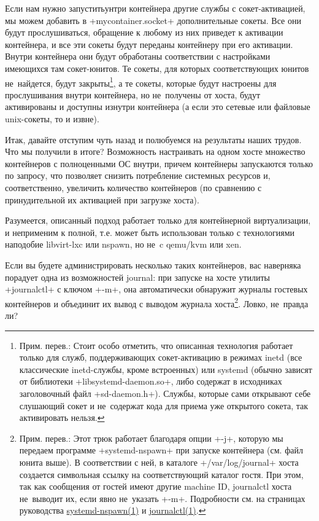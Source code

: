 \documentclass[10pt,oneside,a4paper]{article}
\begin{document}
Если нам нужно запуститьунтри контейнера другие службы с сокет-активацией, мы
можем добавить в +mycontainer.socket+ дополнительные сокеты. Все они будут
прослушиваться, обращение к любому из них приведет к активации контейнера, и все
эти сокеты будут переданы контейнеру при его активации. Внутри контейнера они
будут обработаны соответствии с настройками имеющихся там сокет-юнитов. Те
сокеты, для которых соответствующих юнитов не~найдется, будут
закрыты\footnote{Прим. перев.: Стоит особо отметить, что описанная технология
работает только для служб, поддерживающих сокет-активацию в режимах inetd (все
классические inetd-службы, кроме встроенных) или systemd (обычно зависят от
библиотеки +libsystemd-daemon.so+, либо содержат в исходниках заголовочный файл
+sd-daemon.h+). Службы, которые сами открывают себе слушающий сокет и
не~содержат кода для приема уже открытого сокета, так активировать нельзя.}, а
те сокеты, которые будут настроены для прослушивания внутри контейнера, но
не~получены от хоста, будут активированы и доступны изнутри контейнера (а если
это сетевые или файловые unix-сокеты, то и извне).

Итак, давайте отступим чуть назад и полюбуемся на результаты наших трудов. Что
мы получили в итоге? Возможность настраивать на одном хосте множество
контейнеров с полноценными ОС внутри, причем контейнеры запускаются только по
запросу, что позволяет снизить потребление системных ресурсов и, соответственно,
увеличить количество контейнеров (по сравнению с принудительной их активацией
при загрузке хоста).

Разумеется, описанный подход работает только для контейнерной виртуализации, и
неприменим к полной, т.е. может быть использован только с технологиями наподобие
libvirt-lxc или nspawn, но не~c qemu/kvm или xen.

Если вы будете администрировать несколько таких контейнеров, вас наверняка
порадует одна из возможностей journal: при запуске на хосте утилиты +journalctl+
с ключом +-m+, она автоматически обнаружит журналы гостевых контейнеров и
объединит их вывод с выводом журнала хоста\footnote{Прим. перев.: Этот трюк
работает благодаря опции +-j+, которую мы передаем программе +systemd-nspawn+
при запуске контейнера (см. файл юнита выше). В соответствии с ней, в каталоге
+/var/log/journal+ хоста создается символьная ссылку на соответствующий каталог
гостя. При этом, так как сообщения от гостей имеют другие machine ID, journalctl
хоста не~выводит их, если явно не~указать +-m+. Подробности см. на страницах
руководства
\href{http://www.freedesktop.org/software/systemd/man/systemd-nspawn.html}{systemd-nspawn(1)}
и
\href{http://www.freedesktop.org/software/systemd/man/journalctl.html}{journalctl(1)}.}.
Ловко, не~правда ли?
\end{document}

